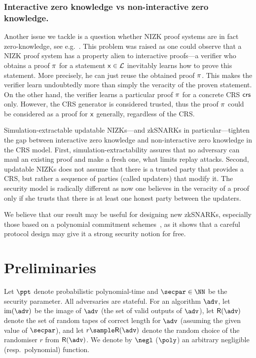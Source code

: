 \let\accentvec\vec \documentclass[runningheads,10pt]{llncs}
\begin{document}
\subsubsection{Interactive zero knowledge vs non-interactive zero knowledge.}
Another issue we tackle is a question whether NIZK proof systems are in
fact zero-knowledge, see e.g.~\cite{C:Pass03}. This problem was raised as one
could observe that a NIZK proof system has a property alien to interactive
proofs---a verifier who obtains a proof $\pi$ for a statement $\mathsf{x} \in
\mathcal{L}$ inevitably learns how to prove this statement. More precisely, he can
just reuse the obtained proof $\pi$. This makes the verifier learn
undoubtedly more than simply the veracity of the proven statement. On the other
hand, the verifier learns a particular proof $\pi$ for a concrete CRS
$\mathsf{crs}$ only. However, the CRS generator is considered trusted, thus the proof
$\pi$ could be considered as a proof for $\mathsf{x}$ generally, regardless of the
CRS.

Simulation-extractable updatable NIZKs---and zkSNARKs in particular---tighten
the gap between interactive zero knowledge and non-interactive zero knowledge in
the CRS model. First, simulation-extractability assures that no adversary can
maul an existing proof and make a fresh one, what limits replay attacks.
Second, updatable NIZKs does not assume that there is a trusted party that
provides a CRS, but rather a sequence of parties (called updaters) that modify
it. The security model is radically different as now one believes in the
veracity of a proof only if she trusts that there is at least one honest party
between the updaters. 

We believe that our result may be useful for designing new zkSNARKs, especially those based on a polynomial commitment schemes~\cite{AC:KatZavGol10}, as it shows that a careful protocol design may give it a strong security notion for free.

\section{Preliminaries}
Let $\ppt$ denote probabilistic polynomial-time and $\secpar \in \NN$ be the
security parameter.  All adversaries are stateful.  For an algorithm $\adv$,
let $\image (\adv)$ be the image of $\adv$ (the set of valid outputs of
$\adv$), let $\RND{\adv}$ denote the set of random tapes of correct length for $\adv$ (assuming the given
value of $\secpar$), and let $r \sample \RND{\adv}$ denote the random choice
of the randomiser $r$ from $\RND{\adv}$.  We denote by $\negl$ ($\poly$) an
arbitrary negligible (resp.~polynomial) function.
\end{document}
